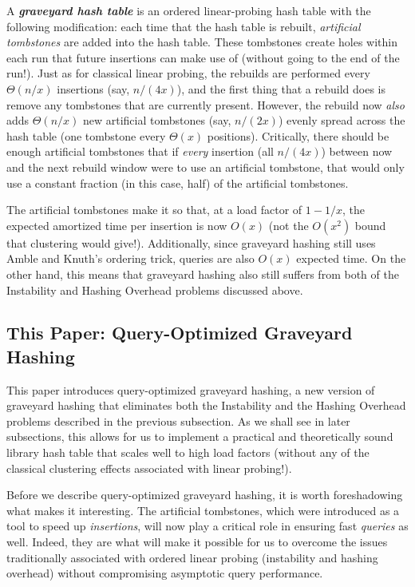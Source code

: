 \documentclass[10pt]{article}
\theoremstyle{remark}
\theoremstyle{remark}
\newcommand{\defn}[1]{\textbf{\emph{#1}}}
\begin{document}
A \defn{graveyard hash table} is an ordered linear-probing hash table with the following modification: each time that the hash table is rebuilt, \emph{artificial tombstones} are added into the hash table. These tombstones create holes within each run that future insertions can make use of (without going to the end of the run!). Just as for classical linear probing, the rebuilds are performed every $\Theta(n/x)$ insertions (say, $n/(4x)$), and the first thing that a rebuild does is remove any tombstones that are currently present. However, the rebuild now \emph{also} adds $\Theta(n/x)$ new artificial tombstones (say, $n/(2x)$) evenly spread across the hash table (one tombstone every $\Theta(x)$ positions). Critically, there should be enough artificial tombstones that if \emph{every} insertion (all $n/(4x)$) between now and the next rebuild window were to use an artificial tombstone, that would only use a constant fraction (in this case, half) of the artificial tombstones.

The artificial tombstones make it so that, at a load factor of $1- 1/x$, the expected amortized time per insertion is now $O(x)$ (not the $O(x^2)$ bound that clustering would give!). Additionally, since graveyard hashing still uses Amble and Knuth's ordering trick, queries are also $O(x)$ expected time. On the other hand, this means that graveyard hashing also still suffers from both of the Instability and Hashing Overhead problems discussed above.

\subsection{This Paper: Query-Optimized Graveyard Hashing}

This paper introduces query-optimized graveyard hashing, a new version of graveyard hashing that eliminates both the Instability and the Hashing Overhead problems described in the previous subsection. As we shall see in later subsections, this allows for us to implement a practical and theoretically sound library hash table that scales well to high load factors (without any of the classical clustering effects associated with linear probing!).

Before we describe query-optimized graveyard hashing, it is worth foreshadowing what makes it interesting. The artificial tombstones, which were introduced as a tool to speed up \emph{insertions}, will now play a critical role in ensuring fast \emph{queries} as well. Indeed, they are what will make it possible for us to overcome the issues traditionally associated with ordered linear probing (instability and hashing overhead) without compromising asymptotic query performance.
\end{document}

